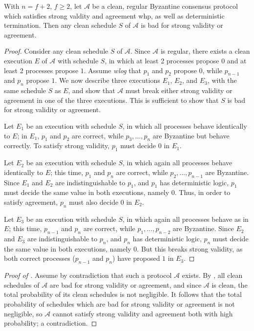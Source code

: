 \begin{lemma}\label{lem:all-schedules-bad}
    With $n=f+2$, $f\geq 2$, let $\mathcal{A}$ be a clean, regular Byzantine consensus protocol which satisfies strong valdity and agreement whp, as well as deterministic termination. Then any clean schedule $S$ of $\mathcal{A}$ is bad for strong validity or agreement.
\end{lemma}

\begin{proof}
    Consider any clean schedule $S$ of $\mathcal{A}$. Since $\mathcal{A}$ is regular, there exists a clean execution $E$ of $\mathcal{A}$ with schedule $S$, in which at least 2 processes propose $0$ and at least 2 processes propose $1$. Assume \textit{wlog} that $p_1$ and $p_2$ propose $0$, while $p_{n-1}$ and $p_n$ propose $1$. We now describe three executions $E_1$, $E_2$, and $E_3$, with the same schedule $S$ as $E$, and show that $\mathcal{A}$ must break either strong validity or agreement in one of the three executions. This is sufficient to show that $S$ is bad for strong validity or agreement.

    Let $E_1$ be an execution with schedule $S$, in which all processes behave identically to $E$; in $E_1$, $p_1$ and $p_2$ are correct, while $p_3,\ldots,p_n$ are Byzantine but behave correctly. To satisfy strong validity, $p_1$ must decide $0$ in $E_1$.

    Let $E_2$ be an execution with schedule $S$, in which again all processes behave identically to $E$; this time, $p_1$ and $p_n$ are correct, while $p_2,\ldots,p_{n-1}$ are Byzantine. Since $E_1$ and $E_2$ are indistinguishable to $p_1$, and $p_1$ has deterministic logic, $p_1$ must decide the same value in both executions, namely $0$. Thus, in order to satisfy agreement, $p_n$ must also decide $0$ in $E_2$. 

    Let $E_3$ be an execution with schedule $S$, in which again all processes behave as in $E$; this time, $p_{n-1}$ and $p_n$ are correct, while $p_1,\ldots,p_{n-2}$ are Byzantine. Since $E_2$ and $E_3$ are indistinguishable to $p_n$, and $p_n$ has deterministic logic, $p_n$ must decide the same value in both executions, namely $0$. But this breaks strong validity, as both correct processes ($p_{n-1}$ and $p_n$) have proposed $1$ in $E_3$.
\end{proof}

\begin{proof}[Proof of ]
    Assume by contradiction that such a protocol $\mathcal{A}$ exists. By , all clean schedules of $\mathcal{A}$ are bad for strong validity or agreement, and since $\mathcal{A}$ is clean, the total probability of its clean schedules is not negligible. It follows that the total probability of schedules which are bad for strong validity or agreement is not negligible, so $\mathcal{A}$ cannot satisfy strong validity and agreement both with high probability; a contradiction.
\end{proof}

